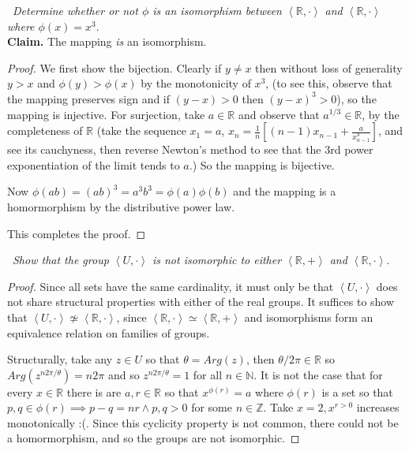 \documentclass[11pt]{amsart}
\def\reals{{\mathbb R}}
\def\integers{{\mathbb Z}}
\newcommand{\group}[2]{\left\langle #1, #2\right\rangle}
\begin{document}
\medskip {}\ \emph{Determine whether or not $\phi$ is an isomorphism between  $\group{\reals}{\cdot}$ and $\group{\reals}{\cdot}$ where $\phi(x) = x^3.$}\\
\textbf{Claim.} The mapping \emph{is} an isomorphism.
\begin{proof}
	We first show the bijection. Clearly if $y \neq x$ then without loss of generality $y > x$ and $\phi(y) > \phi(x)$ by the monotonicity of $x^3$, (to see this, observe that the mapping preserves sign and if $(y-x) >0$ then $(y-x)^3 > 0$), so the mapping is injective. For surjection, take $a \in \mathbb{R}$ and observe that $a^{1/3} \in \mathbb{R}$, by the completeness of $\mathbb{R}$ (take the sequence $x_1 = a$, $x_n = \frac{1}{n}\left[(n-1)x_{n-1} + \frac{a}{x_{n-1}^3}\right]$, and see its cauchyness, then reverse Newton's method to see that the $3$rd power exponentiation of the limit tends to $a$.) So the mapping is bijective.

	Now $\phi(ab) = (ab)^3 = a^3b^3 = \phi(a)\phi(b)$ and the mapping is a homormorphism by the distributive power law.

	This completes the proof. 
\end{proof}

\medskip {}\ \emph{Show that the group $\group{U}{\cdot}$ is not isomorphic to either $\group{\reals}{+}$ and $\group{\reals}{\cdot}.$}
\begin{proof}
	Since all sets have the same cardinality, it must only be that $\group{U}{\cdot}$ does not share structural properties with either of the real groups. It suffices to show that $\group{U}{\cdot} \not\simeq \group{\reals}{\cdot}$, since $\group{\reals}{\cdot} \simeq \group{\reals}{+}$ and isomorphisms form an equivalence relation on families of groups.

	Structurally, take any $z \in U$ so that $\theta = Arg(z)$, then $\theta/2\pi \in \mathbb{R}$ so $Arg(z^{n2\pi/\theta}) = n2\pi$ and so $z^{n2\pi/\theta} =1$  for all $n \in \mathbb{N}$. It is not the case that for every $x \in \mathbb{R}$ there is are $a, r \in \mathbb{R}$ so that $x^{\phi(r)} = a$ where $\phi(r)$ is a set so that $p,q \in \phi(r) \implies p -q = nr \wedge p,q > 0$ for some $n \in \integers$. Take $x = 2, x^{r > 0}$ increases monotonically :(.  Since this cyclicity property is not common, there could not be a homormorphism, and so the groups are not isomorphic.
\end{proof}
\end{document}
